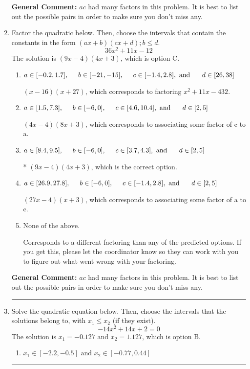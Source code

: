 \documentclass{extbook}[14pt]
\newcommand{\litem}[1]{\item #1

\rule{\textwidth}{0.4pt}}
\begin{document}
\begin{enumerate}
{\textbf{General Comment:} $ac$ had many factors in this problem. It is best to list out the possible pairs in order to make sure you don't miss any.
}
\litem{
Factor the quadratic below. Then, choose the intervals that contain the constants in the form $(ax+b)(cx+d); b \leq d.$
\[ 36x^{2} +11 x -12 \]
The solution is \( (9x -4)(4x + 3) \), which is option C.\begin{enumerate}[label=\Alph*.]
\item \( a \in [-0.2, 1.7], \hspace*{5mm} b \in [-21, -15], \hspace*{5mm} c \in [-1.4, 2.8], \text{ and } \hspace*{5mm} d \in [26, 38] \)

 $(x -16)(x + 27)$, which corresponds to factoring $x^{2} +11 x -432$.
\item \( a \in [1.5, 7.3], \hspace*{5mm} b \in [-6, 0], \hspace*{5mm} c \in [4.6, 10.4], \text{ and } \hspace*{5mm} d \in [2, 5] \)

 $(4x -4)(8x + 3)$, which corresponds to associating some factor of c to a.
\item \( a \in [8.4, 9.5], \hspace*{5mm} b \in [-6, 0], \hspace*{5mm} c \in [3.7, 4.3], \text{ and } \hspace*{5mm} d \in [2, 5] \)

* $(9x -4)(4x + 3)$, which is the correct option.
\item \( a \in [26.9, 27.8], \hspace*{5mm} b \in [-6, 0], \hspace*{5mm} c \in [-1.4, 2.8], \text{ and } \hspace*{5mm} d \in [2, 5] \)

 $(27x -4)(x + 3)$, which corresponds to associating some factor of a to c.
\item \( \text{None of the above.} \)

 Corresponds to a different factoring than any of the predicted options. If you get this, please let the coordinator know so they can work with you to figure out what went wrong with your factoring.
\end{enumerate}

\textbf{General Comment:} $ac$ had many factors in this problem. It is best to list out the possible pairs in order to make sure you don't miss any.
}
\litem{
Solve the quadratic equation below. Then, choose the intervals that the solutions belong to, with $x_1 \leq x_2$ (if they exist).
\[ -14x^{2} +14 x + 2 = 0 \]
The solution is \( x_1 = -0.127 \text{ and } x_2 = 1.127 \), which is option B.\begin{enumerate}[label=\Alph*.]
\item \( x_1 \in [-2.2, -0.5] \text{ and } x_2 \in [-0.77, 0.44] \)


\end{enumerate}}
\end{enumerate}
\end{document}
